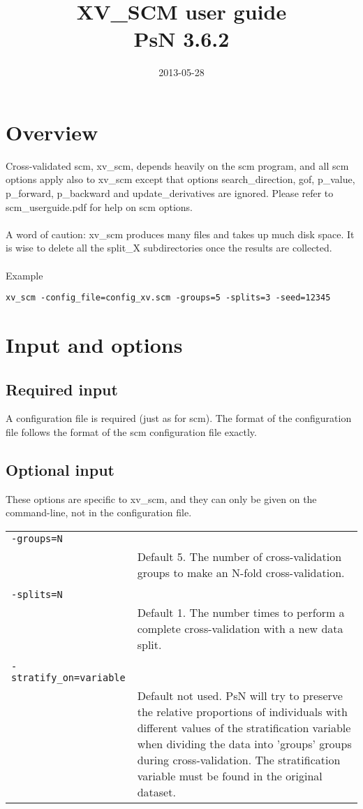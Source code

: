 \documentclass[a4paper,12pt]{article}
\title{XV\_SCM user guide\\ \vspace{2 mm} {\large PsN 3.6.2}}
\date{2013-05-28}
\begin{document}
\maketitle


\section{Overview}
Cross-validated scm, xv\_scm, depends heavily on the scm program, and all scm options apply also to xv\_scm except that options search\_direction, gof, p\_value, p\_forward, p\_backward and update\_derivatives are ignored. Please refer to scm\_userguide.pdf for help on scm options.
\\
\\
A word of caution: xv\_scm produces many files and takes up much disk space. It is wise to delete all the split\_X subdirectories once the results are collected.
\\
\\
Example
\begin{verbatim}
xv_scm -config_file=config_xv.scm -groups=5 -splits=3 -seed=12345
\end{verbatim}

\section{Input and options}

\subsection{Required input}
A configuration file is required (just as for scm).  The format of the configuration file follows the format of the scm configuration file exactly.

\subsection{Optional input}

These options are specific to xv\_scm, and they can only be given on the command-line, not in the configuration file.

\begin{longtable}{p{1in}p{4in}}
\verb|-groups=N| & \\
\nopagebreak
 & Default 5. The number of cross-validation groups to make an N-fold cross-validation. \\
\\
\verb|-splits=N| & \\
\nopagebreak
 & Default 1. The number times to perform a complete cross-validation with a new data split. \\
\\
\verb|-stratify_on=variable| & \\
\nopagebreak
 & Default not used. PsN will try to preserve the relative proportions of individuals with different values of the stratification variable when dividing the data into 'groups' groups during cross-validation. The stratification variable must be found in the original dataset. \\
\end{longtable}
\end{document}
